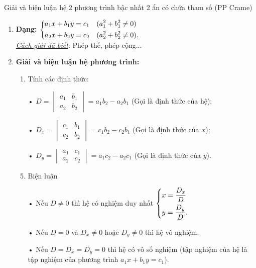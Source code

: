 
\begin{dang}{Giải và biện luận hệ 2 phương trình bậc nhất 2 ẩn có chứa tham số (PP Crame)}
\begin{enumerate}
\item \textbf{Dạng:}
$\left\{\begin{aligned}&a_1x+b_1y=c_1\quad (a_1^2+b_1^2 \ne 0)\\&a_2x+b_2y=c_2\quad (a_2^2+b_2^2 \ne 0).\end{aligned}\right.$\\
\underline{\textit{Cách giải đã biết}}: Phép thế, phép cộng...
\item \textbf{Giải và biện luận hệ phương trình:}
\begin{enumerate}[Bước 1:]
\item Tính các định thức:
\item[•] $D=\begin{vmatrix}
a_1 & b_1 \\ 
a_2 & b_2
\end{vmatrix}=a_1b_2-a_2b_1 $ (Gọi là định thức của hệ);
\item[•] $D_x=\begin{vmatrix}
c_1 & b_1 \\ 
c_2 & b_2
\end{vmatrix}=c_1b_2-c_2b_1$ (Gọi là định thức của $x$);
\item[•] $D_y=\begin{vmatrix}
a_1 & c_1 \\ 
a_2 & c_2
\end{vmatrix}=a_1c_2-a_2c_1 $ (Gọi là định thức của $y$).
\item Biện luận
\item[•] Nếu $D \ne 0$ thì hệ có nghiệm duy nhất $\left\{\begin{aligned}&x=\dfrac{D_x}{D}\\&y=\dfrac{D_y}{D}.\end{aligned}\right.$
\item[•] Nếu $D=0$ và $D_x \ne 0$ hoặc $D_y \ne 0$ thì hệ vô nghiệm.
\item[•] Nếu $D=D_x=D_y=0$ thì hệ
 có vô số nghiệm (tập nghiệm của hệ là tập nghiệm của phương trình $a_1x+b_1y=c_1$).
\end{enumerate}
\end{enumerate}
\end{dang}

